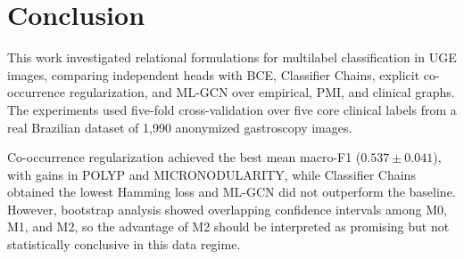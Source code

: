 \documentclass[12pt]{article}
\begin{document}



\section{Conclusion}
\label{sec:Conclusion}

This work investigated relational formulations for multilabel classification in UGE images, comparing independent heads with BCE, Classifier Chains, explicit co-occurrence regularization, and ML-GCN over empirical, PMI, and clinical graphs. The experiments used five-fold cross-validation over five core clinical labels from a real Brazilian dataset of 1,990 anonymized gastroscopy images.

Co-occurrence regularization achieved the best mean macro-F1 ($0.537 \pm 0.041$), with gains in POLYP and MICRONODULARITY, while Classifier Chains obtained the lowest Hamming loss and ML-GCN did not outperform the baseline. However, bootstrap analysis showed overlapping confidence intervals among M0, M1, and M2, so the advantage of M2 should be interpreted as promising but not statistically conclusive in this data regime.
\end{document}
